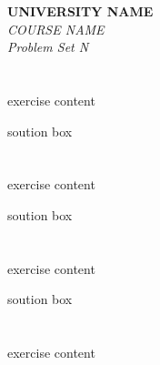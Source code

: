 \documentclass[12pt]{article}
\begin{document}
\begin{center}
	\Large\textbf{UNIVERSITY NAME} \\[1em]
	\large\textit{COURSE NAME} \\[2em]
	\large\textit{Problem Set N} \\[0.5em]
\end{center}

\vspace{1cm}

\section{}
exercise content


\begin{correctionbox}
	soution box
\end{correctionbox}

\section{}
exercise content


\begin{correctionbox}
	soution box
\end{correctionbox}

\section{}
exercise content


\begin{correctionbox}
	soution box
\end{correctionbox}

\section{}
exercise content
\end{document}
